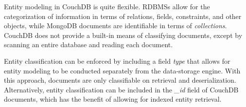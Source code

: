Entity modeling in CouchDB is quite flexible. RDBMSs allow for the categorization of information in terms of relations, fields, constraints, and other objects, while MongoDB documents are identifiable in terms of \textit{collections}. CouchDB does not provide a built-in means of classifying documents, except by scanning an entire database and reading each document.

Entity classification can be enforced by including a field \textit{type} that allows for entity modeling to be conducted separately from the data-storage engine. With this approach, documents are only classifiable on retrieval and deserialization. Alternatively, entity classification can be included in the \textit{\_id} field of CouchDB documents, which has the benefit of allowing for indexed entity retrieval.